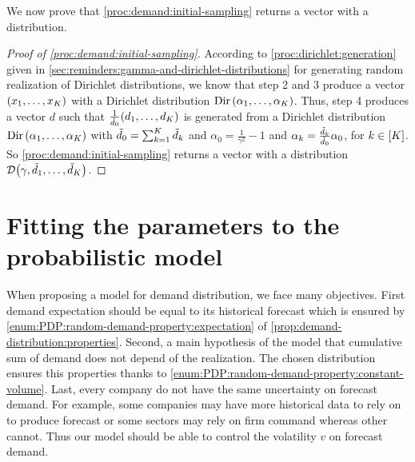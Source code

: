 We now prove that \cref{proc:demand:initial-sampling} returns a vector with a \distrib distribution.


\begin{proof}[Proof of \cref{proc:demand:initial-sampling}]
According to \cref{proc:dirichlet:generation} given in \cref{sec:reminders:gamma-and-dirichlet-distributions} for generating random realization of Dirichlet distributions, we know that step 2 and 3 produce a vector $\bracket{x_1,\ldots,x_K}$ with a Dirichlet distribution $\Dir\bracket{\alpha_1,\ldots,\alpha_K}$.
Thus, step 4 produces a vector $d$ such that $\frac{1}{\tilde{\demand}_0}\bracket{\demand_1,\ldots,\demand_K}$ is generated from a Dirichlet distribution $\Dir\bracket{\alpha_1,\ldots,\alpha_K}$ with $\tilde{d}_0 = \sum_{k=1}^K\tilde{d}_k$ and $\alpha_0 = \frac{1}{\gamma^2}-1$ and $\alpha_k=\frac{\tilde{d}_k}{\tilde{d}_0}\alpha_0$, for $k\in\range{K}$.
So \cref{proc:demand:initial-sampling} returns a vector with a \distrib distribution $\cD\bracket{\gamma,\tilde{\demand}_1,\ldots,\tilde{\demand}_K}$.
\end{proof}



\section{Fitting the parameters to the probabilistic model}
\label{sec:PDP:numerical-experiments:instances:fitting-parameters}


When proposing a model for demand distribution, we face many objectives.
First demand expectation should be equal to its historical forecast which is ensured by \cref{enum:PDP:random-demand-property:expectation} of \cref{prop:demand-distribution:properties}.
Second, a main hypothesis of the model that cumulative sum of demand does not depend of the realization.
The chosen distribution ensures this properties thanks to \cref{enum:PDP:random-demand-property:constant-volume}.
Last, every company do not have the same uncertainty on forecast demand.
For example, some companies may have more historical data to rely on to produce forecast or some sectors may rely on firm command whereas other cannot.
Thus our model should be able to control the volatility $v$ on forecast demand.


